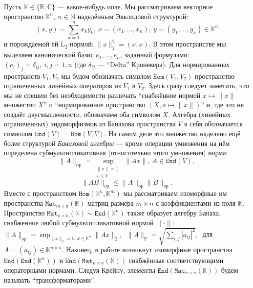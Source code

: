 \documentclass[14pt,a4paper]{extarticle}
\numberwithin{equation}{section}
\theoremstyle{definition}
\begin{document}
Пусть \( \mathbb{K}\in \{ \mathbb{R}, \mathbb{C} \} \)
--- какое-нибудь поле.
Мы рассматриваем векторное пространство \( \mathbb{K}^n,\ n\in \mathbb{N} \)
наделённым Эвклидовой структурой:
    \[
        (x, y){=}\sum_{k=1}^n x_k\overline{y_k},
        \ x{=}(x_1,\ldots, x_n),
        \ y=(y_1,\ldots, y_n)
        \in \mathbb{K}^n
        \]
    и порождаемой ей \( \mathrm{L}_2 \)-нормой:
    \(
        \|x\|_2^2{=}(x,x).
        \)
В этом пространстве мы выделяем канонический базис \( e_1, \ldots, e_n \),
        заданный формулами:
        \( {(e_i)}_j = \delta_{ij},\ i,j=\overline{1,n} \)
    (где \(\delta_{ij} \) --- ``Delta'' Кронекера).
Для нормированных пространств \( V_1, V_2 \) 
    мы будем обозначать симвлом \( \mathtt{Hom}(V_1, V_2) \)
    пространство ограни\-ченных линейных операторов
    из \( V_1 \) в \( V_2 \).
Здесь сразу следует заметить, что мы не спешим без необходимости различать
``снабжённое нормой \(x\mapsto \|x\| \) множество \( X \)''
и ``нормированное пространство \( (X, x\mapsto \|x\|) \)''
и, где это не создаёт двусмысленности, обозначаем оба символом \( X \).
Алгебра (линейных ограниченных) эндоморфизмов
    из Банахова пространства \( V \)
    в себя обозначается символом \( \mathtt{End}(V) = \mathtt{Hom}(V, V) \).
На самом деле это множество наделено ещё более структурой \emph{Банаховой
  алгебры} --- кроме операции умножения на нём определена суб\-мульти\-пликатив\-ная
(относительно этого умножения) норма:
    \[
        \|A\|_{\mathrm{op}} =
        \sup_{
            \substack{\|x\|=1,\\ x\in V}
        } \|A x\|,\ A\in \mathtt{End}(V),
        \]
     \[
       \|AB\|_{\mathrm{op}} \leq \|A\|_{\mathrm{op}} \|B\|_{\mathrm{op}}.
        \]
Вместе с пространством \( \mathtt{Hom}(\mathbb{K}^n, \mathbb{K}^m) \)
    мы рассматриваем изоморфные им пространства \(
    \mathtt{Mat}_{m{\times}n}(\mathbb{K}) \)
    матриц размера \( m{\times}n \)
    с коэффициентами из поля \( \mathbb{K} \).
Пространство \( \mathtt{Mat}_{n{\times}n}(\mathbb{K})\sim
\mathtt{End}(\mathbb{K}^n) \)
также образует алгебру Банаха, снабженное любой суб\-мульти\-пликатив\-ной нормой
    \( \|\cdot\| \):
    \( \|A\|_{\mathrm{op}} = \sup_{\|x\|_2=1,\ x\in \mathbb{K}^n} \|A x\|_2,\ \)
    \( \|A\|_{\mathrm{F}} = \sqrt{\sum_{i,j} |a_{ij}|^2},\ \)
    для 
    \( A{=}(a_{ij})\in\mathbb{K}^{n\times n} \).
Наконец, в работе возникнут изоморфные пространства
    \( \mathtt{End}(\mathtt{End}(\mathbb{K}^n)) \) и \(
    \mathtt{End}(\mathtt{Mat}_{n{\times}n}(\mathbb{K})) \)
    снабжённые соответствующими операторными нормами.
Следуя Крейну, элементы \( \mathtt{End}(\mathtt{Mat}_{n{\times}n}(\mathbb{K})) \)
    будем называть ``транс\-форм\-аторами''.
\end{document}
